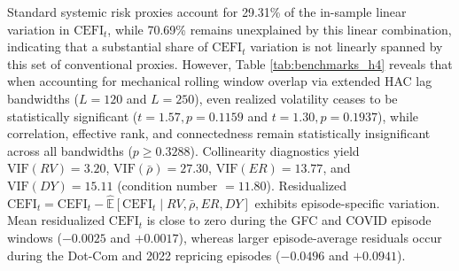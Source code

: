 \documentclass[review,12pt,authoryear]{elsarticle}
\begin{document}
\begin{table}[htbp]
\centering
\caption{Linear Association Between $\mathrm{CEFI}_t$ and Conventional Systemic Risk Benchmarks: Sensitivity Across Extended HAC Lag Bandwidths ($L \in \{40, 120, 250\}$)}
\label{tab:benchmarks_h4}
\end{table}

Standard systemic risk proxies account for 29.31\% of the in-sample linear variation in $\mathrm{CEFI}_t$, while 70.69\% remains unexplained by this linear combination, indicating that a substantial share of $\mathrm{CEFI}_t$ variation is not linearly spanned by this set of conventional proxies. However, Table \ref{tab:benchmarks_h4} reveals that when accounting for mechanical rolling window overlap via extended HAC lag bandwidths ($L=120$ and $L=250$), even realized volatility ceases to be statistically significant ($t=1.57, p=0.1159$ and $t=1.30, p=0.1937$), while correlation, effective rank, and connectedness remain statistically insignificant across all bandwidths ($p \ge 0.3288$). Collinearity diagnostics yield $\text{VIF}(RV) = 3.20$, $\text{VIF}(\bar{\rho}) = 27.30$, $\text{VIF}(ER) = 13.77$, and $\text{VIF}(DY) = 15.11$ (condition number $= 11.80$). Residualized $\mathrm{CEFI}_t = \mathrm{CEFI}_t - \hat{\mathbb{E}}[\mathrm{CEFI}_t \mid RV, \bar{\rho}, ER, DY]$ exhibits episode-specific variation. Mean residualized $\mathrm{CEFI}_t$ is close to zero during the GFC and COVID episode windows ($-0.0025$ and $+0.0017$), whereas larger episode-average residuals occur during the Dot-Com and 2022 repricing episodes ($-0.0496$ and $+0.0941$).
\end{document}
